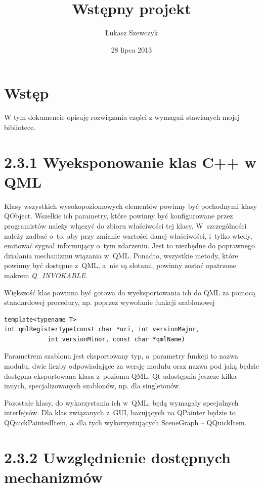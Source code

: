 \documentclass[11pt,twoside,a4paper,final]{llncs}
\begin{document}
\date{28 lipca 2013}
\title{Wstępny projekt}

\author{Łukasz Szewczyk}
\maketitle


\section{Wstęp}
W tym dokumencie opisuję rozwiązania części z wymagań stawianych mojej bibliotece.

\section{2.3.1 Wyeksponowanie klas C++ w QML}
Klasy wszystkich wysokopoziomowych elementów powinny być pochodnymi klasy QObject. Wszelkie ich parametry, które powinny być konfigurowane przez programistów należy włączyć do zbioru właściwości tej klasy. W~szczególności należy zadbać o~to, aby przy zmianie wartości danej właściwości, i~tylko wtedy, emitować sygnał informujący o~tym zdarzeniu. Jest to niezbędne do poprawnego działania mechanizmu wiązania w~QML. Ponadto, wszystkie metody, które powinny być dostępne z~QML, a~nie są slotami, powinny zostać opatrzone makrem \textit{Q\_INVOKABLE}.

Większość klas powinna być gotowa do wyeksportowania ich do QML za pomocą standardowej procedury, np. poprzez wywołanie funkcji szablonowej
\begin{lstlisting}
template<typename T>
int qmlRegisterType(const char *uri, int versionMajor, 
		    int versionMinor, const char *qmlName)
\end{lstlisting}
Parametrem szablonu jest eksportowany typ, a~parametry funkcji to nazwa modułu, dwie liczby odpowiadające za wersję modułu oraz nazwa pod jaką będzie dostępna eksportowana klasa z~poziomu QML. Qt udostępnia jeszcze kilka innych, specjalizowanych szablonów, np. dla singletonów.\newline

Pozostałe klasy, do wykorzystania ich w~QML, będą wymagały specjalnych interfejsów. Dla klas związanych z~GUI, bazujących na QPainter będzie to QQuickPaintedItem, a~dla tych wykorzystujących SceneGraph -- QQuickItem.

\section{2.3.2 Uwzględnienie dostępnych mechanizmów}
\end{document}
